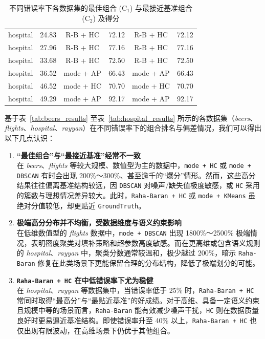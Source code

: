 \documentclass[10pt]{article} %
\numberwithin{equation}{section}
\begin{document}
\begin{table}[htbp]
\begin{subtable}{0.48\linewidth}
\begin{tabular}{lccccc}
            hospital & 24.83 & R-B + HC  & 72.12  & R-B + HC  & 72.12  \\
            hospital & 27.96 & R-B + HC  & 77.16  & R-B + HC  & 77.16  \\
            hospital & 33.68 & R-B + HC  & 72.50  & R-B + HC  & 72.50  \\
            hospital & 36.52 & mode + AP & 66.43  & mode + AP & 66.43  \\
            hospital & 46.52 & mode + HC & 70.70  & mode + HC & 70.70  \\
            hospital & 49.29 & mode + AP & 92.17  & mode + AP & 92.17  \\
            \bottomrule
        \end{tabular}
    \end{subtable}

    \caption{不同错误率下各数据集的最佳组合 (C$_1$) 与最接近基准组合 (C$_2$) 及得分}
    \label{tab:all_results}
\end{table}

\vspace{0.5em}
\noindent
基于表~\ref{tab:beers_results} 至表~\ref{tab:hospital_results} 所示的各数据集（\textit{beers}、\textit{flights}、\textit{hospital}、\textit{rayyan}）在不同错误率下的组合排名与偏差情况，我们可以得出以下几点认识：

\begin{enumerate}
    \item \textbf{“最佳组合”与“最接近基准”经常不一致}\\
    在 \textit{beers}、\textit{flights} 等较大规模、数值型为主的数据中，\texttt{mode + HC} 或 \texttt{mode + DBSCAN} 有时会出现 200\%～300\%、甚至逾千的“爆分”情形。然而，这些高分结果往往偏离基准结构较远，因 \texttt{DBSCAN} 对噪声/缺失值极度敏感，或 \texttt{HC} 采用的簇数与理想情况差异较大。此时，\texttt{Raha-Baran + HC} 或 \texttt{mode + KMeans} 虽绝对分值较低，却更贴近 \texttt{GroundTruth}。

    \item \textbf{极端高分分布并不均衡，受数据维度与语义约束影响}\\
    在低维数值型的 \textit{flights} 数据中，\texttt{mode + DBSCAN} 出现 1800\%～2500\% 极端情况，表明密度聚类对填补策略和超参数高度敏感。而在更高维或包含语义规则的 \textit{hospital}、\textit{rayyan} 中，聚类分数通常较温和，极少越过 200\%，暗示 \texttt{Raha-Baran} 修复在此类场景下更能保留合理的分布结构，降低了极端划分的可能。

    \item \textbf{\texttt{Raha-Baran + HC} 在中低错误率下尤为稳健}\\
    在 \textit{hospital}、\textit{rayyan} 等数据集中，当错误率低于 25\% 时，\texttt{Raha-Baran + HC} 常同时取得“最高分”与“最贴近基准”的好成绩。对于高维、具备一定语义约束且规模中等的场景而言，\texttt{Raha-Baran} 能有效减少噪声干扰，\texttt{HC} 则在数据质量良好时更易逼近基准结构。即使错误率升至 40\% 以上，\texttt{Raha-Baran + HC} 也仅出现有限波动，在高维场景下仍优于其他组合。
\end{enumerate}
\end{document}
